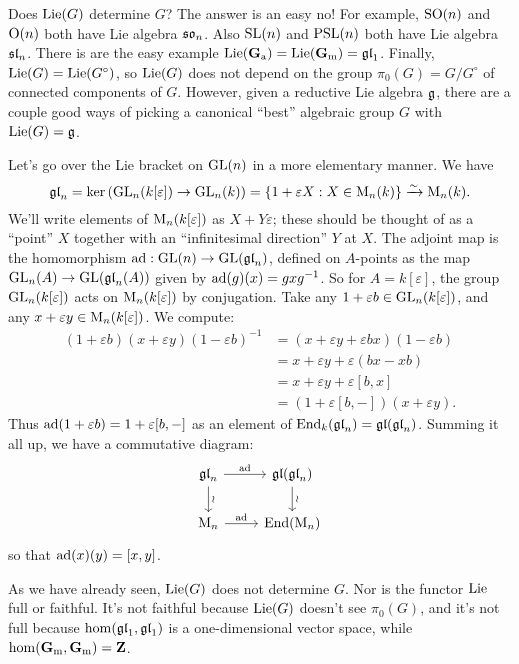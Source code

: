 Does $\operatorname{Lie}(G)$ determine $G$? The answer is an easy no! For example, 
$\operatorname{SO}(n)$ and $\operatorname{O}(n)$ both have Lie algebra $\mathfrak{so}_n$. Also 
$\operatorname{SL}(n)$ and $\operatorname{PSL}(n)$ both have Lie algebra $\mathfrak{sl}_n$. There is are the 
easy example $\operatorname{Lie}(\mathbf{G}_\mathrm{a})=\operatorname{Lie}(\mathbf{G}_\mathrm{m})=\mathfrak{gl}_1$. Finally, 
$\operatorname{Lie}(G)=\operatorname{Lie}(G^\circ)$, so $\operatorname{Lie}(G)$ does not depend on the group 
$\pi_0(G)=G/G^\circ$ of connected components of $G$. However, given a 
reductive Lie algebra $\mathfrak{g}$, there are a couple good ways of picking a 
canonical ``best'' algebraic group $G$ with $\operatorname{Lie}(G)=\mathfrak{g}$. 

\begin{example}
Let's go over the Lie bracket on $\operatorname{GL}(n)$ in a more elementary manner. We have 
\[
  \mathfrak{gl}_n = \ker\left(\operatorname{GL}_n(k[\varepsilon])\to\operatorname{GL}_n(k)\right) = \{1+\varepsilon X:X\in \operatorname{M}_n(k)\} \xrightarrow\sim \operatorname{M}_n(k) .
\]
We'll write elements of $\operatorname{M}_n(k[\varepsilon])$ as $X+Y\varepsilon$; 
these should be thought of as a ``point'' $X$ together with an ``infinitesimal 
direction'' $Y$ at $X$. The adjoint map is the homomorphism 
$\operatorname{ad}:\operatorname{GL}(n)\to \operatorname{GL}(\mathfrak{gl}_n)$, defined on $A$-points as the map 
$\operatorname{GL}_n(A)\to \operatorname{GL}(\mathfrak{gl}_n(A))$ given by $\operatorname{ad}(g)(x) = g x g^{-1}$. So for 
$A=k[\varepsilon]$, the group $\operatorname{GL}_n(k[\varepsilon])$ acts on 
$\operatorname{M}_n(k[\varepsilon])$ by conjugation. Take any 
$1+\varepsilon b\in \operatorname{GL}_n(k[\varepsilon])$, and any 
$x+\varepsilon y\in \operatorname{M}_n(k[\varepsilon])$. We compute: 
\begin{align*}
  (1+\varepsilon b)(x+\varepsilon y)(1-\varepsilon b)^{-1} 
    &= (x+\varepsilon y+\varepsilon b x)(1-\varepsilon b) \\
    &= x+\varepsilon y + \varepsilon(b x-x b) \\
    &= x+\varepsilon y + \varepsilon [b,x] \\
    &= (1+\varepsilon[b,-])(x+\varepsilon y) .
\end{align*}
Thus $\operatorname{ad}(1+\varepsilon b)=1+\varepsilon [b,-]$ as an element of 
$\operatorname{End}_k(\mathfrak{gl}_n) = \mathfrak{gl}(\mathfrak{gl}_n)$. Summing it all up, we have a commutative 
diagram: 
\[\begin{tikzcd}
  \gl_n \ar[r, "\adjoint"] \ar[d, "\wr"]
    & \gl(\gl_n) \ar[d, "\wr"] \\
  \matrices_n \ar[r, "\adjoint"] 
    & \End(\matrices_n)
\end{tikzcd}\]
so that $\operatorname{ad}(x)(y) = [x,y]$. 
\end{example}

As we have already seen, $\operatorname{Lie}(G)$ does not determine $G$. Nor is the functor 
$\operatorname{Lie}$ full or faithful. It's not faithful because $\operatorname{Lie}(G)$ doesn't see 
$\pi_0(G)$, and it's not full because $\hom(\mathfrak{gl}_1,\mathfrak{gl}_1)$ is a one-dimensional 
vector space, while $\hom(\mathbf{G}_\mathrm{m},\mathbf{G}_\mathrm{m})=\mathbf{Z}$. 

